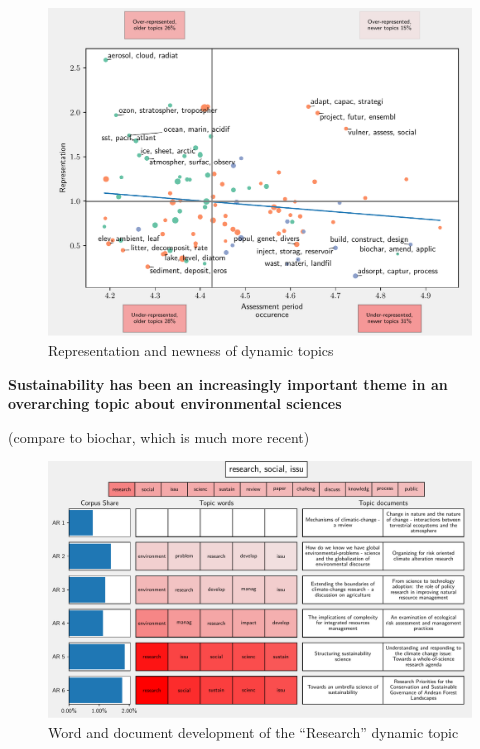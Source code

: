 \documentclass{article}
\begin{document}
\begin{linenumbers}
%



\begin{figure}
	\begin{center}
		\includegraphics[width=1\linewidth]{plots/ipcc_representation/ipcc_rep_new665_all.pdf}
		\caption{Representation and newness of dynamic topics}
		\label{}
	\end{center}
\end{figure}


\bigskip
\noindent\textbf{Sustainability has been an increasingly important theme in an overarching topic about environmental sciences}

(compare to biochar, which is much more recent)

\begin{figure}
	\begin{center}
		\includegraphics[width=1\linewidth]{plots/single_topic_3_11046.pdf}
		\caption{Word and document development of the ``Research'' dynamic topic}
		\label{}
	\end{center}
\end{figure}


\end{linenumbers}
\end{document}
